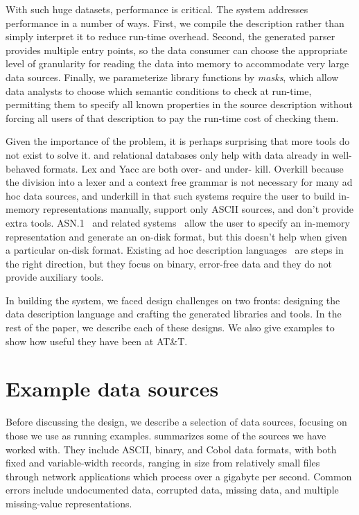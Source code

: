 \documentclass{sig-alternate}
\begin{document}
With such huge datasets, performance is critical. The \pads{} system addresses performance in a number of ways.
First, we compile the \pads{} description rather than simply interpret it to reduce run-time overhead.
Second, the generated parser provides  multiple entry points, so the data consumer can choose 
the appropriate level of granularity for reading the data into memory to accommodate very large data sources.
Finally, we parameterize library functions by \textit{masks}, which allow data analysts to 
choose which semantic conditions to check at run-time, permitting them to specify
all known properties in the source description without forcing all users of that 
description to pay the run-time cost of checking them.  

Given the importance of the problem, it is perhaps surprising
that more tools do not exist to solve it.  \xml{} and relational databases
only help with data already in well-behaved formats.  Lex and Yacc are both
over- and under- kill.  Overkill because the division into a lexer and a context free grammar is not necessary for many ad hoc data sources, and underkill in that such systems require the user to build in-memory representations manually,
support only ASCII sources, and don't provide extra tools.  ASN.1~\cite{asn} and related systems~\cite{asdl} allow the user to specify an in-memory representation and generate an on-disk format, but this doesn't help when given a particular on-disk format.  
Existing ad hoc description languages~\cite{gpce02,sigcomm00,erlang} are steps 
in the right direction, but they focus on binary, error-free data and they do not provide auxiliary tools.

In building the \pads{} system, we faced design challenges on two fronts:
designing the data description language and
crafting the generated libraries and tools.
In the rest of the paper, 
we describe each of these designs.
We also give examples to show how useful they have been at AT\&T.


\section{Example data sources}

Before discussing the \pads{} design, we describe a selection of data
sources, focusing on those we use as running examples.
 summarizes some of the sources we have
worked with.  They include ASCII, binary, and Cobol data formats, with
both fixed and variable-width records, ranging in size from
relatively small files through network applications which process over
a gigabyte per second.  Common errors include undocumented data,
corrupted data, missing data, and multiple missing-value
representations.
\end{document}
